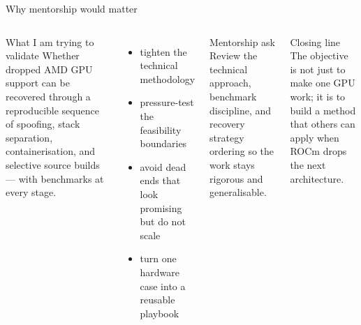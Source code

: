 \documentclass[aspectratio=169,11pt]{beamer}
\begin{document}
\begin{frame}[shrink=8]{Why mentorship would matter}
    \begin{columns}[T,onlytextwidth]
        \begin{block}{What I am trying to validate}
            Whether dropped AMD GPU support can be recovered through a reproducible sequence of spoofing, stack separation, containerisation, and selective source builds — with benchmarks at every stage.
        \end{block}

        \begin{itemize}
            \item tighten the technical methodology
            \item pressure-test the feasibility boundaries
            \item avoid dead ends that look promising but do not scale
            \item turn one hardware case into a reusable playbook
        \end{itemize}

        \begin{exampleblock}{Mentorship ask}
            Review the technical approach, benchmark discipline, and recovery strategy ordering so the work stays rigorous and generalisable.
        \end{exampleblock}

        \vspace{0.3cm}
        \begin{block}{Closing line}
            The objective is not just to make one GPU work; it is to build a method that others can apply when ROCm drops the next architecture.
        \end{block}
    \end{columns}
\end{frame}
\end{document}
